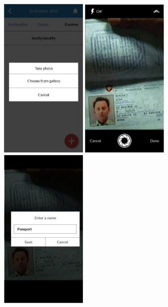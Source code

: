 \begin{figure}
  \subfigures
  \centering
  \begin{minipage}{4.6cm}
    \centering
    \includegraphics[width=4.2cm]{inc/ui_takedown_step9.jpg}
    \caption{}
    \label{fig:ui_takedown_step9}
  \end{minipage}
  \begin{minipage}{4.6cm}
    \centering
    \includegraphics[width=4.2cm]{inc/ui_takedown_step10.jpg}
    \caption{}
    \label{fig:ui_takedown_step10}
  \end{minipage}
  \begin{minipage}{4.6cm}
    \centering
    \includegraphics[width=4.2cm]{inc/ui_takedown_step11.jpg}
    \caption{}
    \label{fig:ui_takedown_step11}
  \end{minipage}
\end{figure}

